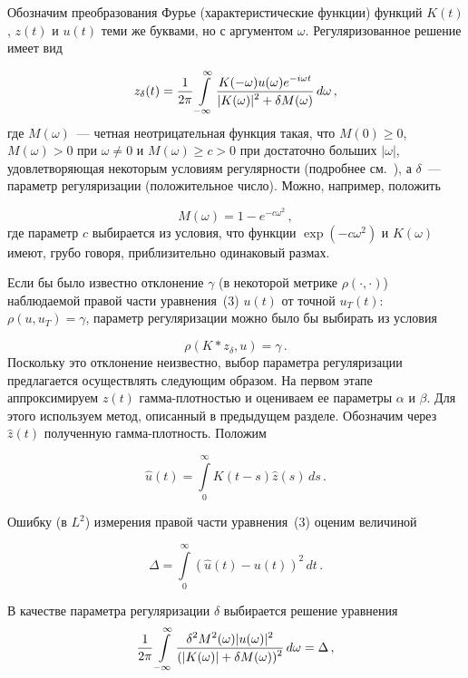 \begin{multicols}{2}
Обозначим преобразования Фурье (характеристические функции)
функций $K(t)$, $z(t)$ и $u(t)$ теми же буквами, но с аргументом
$\omega$. Регуляризованное решение имеет вид

\noindent
$$
z_\delta(t)=\displaystyle\frac{\displaystyle 1\mathstrut}{\displaystyle 2\pi\mathstrut}\int\limits_{-\infty}^\infty
\displaystyle\frac{\displaystyle K(-\omega)u(\omega)e^{-i\omega t}\mathstrut}{\displaystyle |K(\omega)|^2+\delta
M(\omega)\mathstrut}\,d\omega\,,
$$ 
где $M(\omega)$~--- четная неотрицательная
функция такая, что $M(0)\ge0$, $M(\omega)>0$ при $\omega\not=0$ и
$M(\omega)\ge c>0$ при достаточно больших $|\omega|$,
удов\-ле\-тво\-ря\-ющая некоторым условиям регулярности (подробнее см.~\cite{7us}), 
а $\delta$~--- параметр регуляризации (положительное число).
Можно, например, положить 


\noindent
$$
M(\omega)=1-e^{-c\omega^2}\,,
$$ 
где параметр $c$ выбирается из условия, что функции $\exp(-c\omega^2)$
и $K(\omega)$ имеют, грубо говоря, приблизительно одинаковый
размах.

Если бы было известно отклонение $\gamma$ (в некоторой метрике
$\rho(\cdot,\cdot)$) наблюдаемой правой части уравнения~(3) $u(t)$
от точной $u_T(t)$: $\rho(u,u_T)=\gamma$, параметр регуляризации
можно было бы выбирать из условия 


\noindent
$$
\rho(K\ast z_\delta,u)=\gamma\,.
$$ 
Поскольку это отклонение неизвестно, выбор
параметра регуляризации предлагается осуществлять следующим
образом. На первом этапе аппроксимируем $z(t)$ гамма-плотностью и
оцениваем ее параметры $\alpha$ и $\beta$. Для этого используем
метод, описанный в предыдущем разделе. Обозначим через $\hat z(t)$
полученную гамма-плотность. Положим 

\vspace*{2pt}

\noindent
$$
\hat u(t)=\int\limits_0^\infty K(t-s)\hat z(s)\,ds\,.
$$ 

\noindent
Ошибку (в $L^2$) измерения правой части
уравнения~(3) оценим величиной 

\vspace*{2pt}

\noindent
$$
\Delta=\int\limits_0^\infty(\hat u(t)-u(t))^2\,dt\,.
$$ 

\noindent
В качестве параметра регуляризации $\delta$
выбирается решение уравнения
$$
\displaystyle\frac{\displaystyle 1\mathstrut}{\displaystyle 2\pi\mathstrut}\int\limits_{-\infty}^\infty 
\displaystyle\frac{\displaystyle \delta^2M^2(\omega)|u(\omega)|^2\mathstrut}{\displaystyle (|K(\omega)|+\delta
M(\omega))^2\mathstrut}\,d\omega=\Delta\,,
$$  


\end{multicols}
